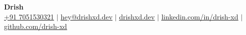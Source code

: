 \documentclass[a4paper,11pt]{article}
\begin{document}
\begin{center}
    \textbf{\Huge Drish} \\
    \small
    \href{tel:+917051530321}{+91 7051530321}
    $|$
    \href{mailto:hey@drishxd.dev}{\ul{hey@drishxd.dev}}
    $|$
    \href{https://drishxd.dev}{\ul{drishxd.dev}}
    $|$
    \href{https://linkedin.com/in/drish-xd}{\ul{linkedin.com/in/drish-xd}}
    $|$
    \href{https://github.com/drish-xd}{\ul{github.com/drish-xd}}
\end{center}


\sectionEnd


\sectionEnd

\li{}
\sectionEnd


\sectionEnd

\li{}
\sectionEnd
\end{document}
